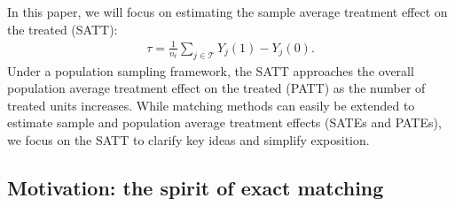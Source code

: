 \documentclass{article}
\begin{document}
In this paper, we will focus on estimating the sample average treatment effect on the treated (SATT):
\begin{align*}
    \tau = \frac{1}{n_t} \sum_{j \in \mathcal{T}} Y_j(1) - Y_j(0).
\end{align*}
Under a population sampling framework, the SATT approaches the overall population average treatment effect on the treated (PATT) as the number of treated units increases.
While matching methods can easily be extended to estimate sample and population average treatment effects (SATEs and PATEs), we focus on the SATT to clarify key ideas and simplify exposition.



\subsection{Motivation: the spirit of exact matching}
\label{sec:toy}
\end{document}
